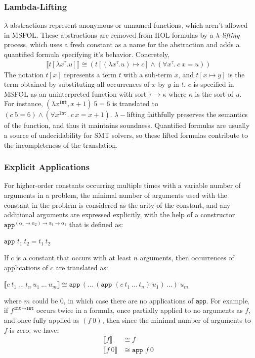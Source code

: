 \documentclass[11pt]{article}
\begin{document}
	\subsubsection{Lambda-Lifting}
	$\lambda$-abstractions represent 
	anonymous or unnamed functions, 
	which aren't allowed in MSFOL.
	These abstractions are removed
	from HOL formulas by a 
	\textit{$\lambda$-lifting} process,
	which uses a fresh constant as a
	name for the abstraction and adds 
	a quantified formula specifying 
	it's behavior. Concretely,
	\begin{align*}
	\llbracket t[\lambda x^{\tau}.u]
	\rrbracket \cong 
	(t[(\lambda x^{\tau}.u) \mapsto c]
	\land (\forall x^{\tau}.\ c\ x = u))
	\end{align*}
	The notation $t[x]$ represents a 
	term $t$ with a sub-term $x$, 
	and $t[x \mapsto y]$ is the 
	term obtained by substituting all 
	occurrences of $x$ by $y$ in $t$.
	$c$ is specified in MSFOL as an 
	uninterpreted function with sort 
	$\tau \to \kappa$ where $\kappa$ 
	is the sort of $u$. For instance, 
	$(\lambda x^{\texttt{Int}}, x + 1)\ 
	5 = 6$
	is translated to $(c\ 5 = 6) \land
	(\forall x^{\texttt{Int}}.\ 
	c\ x = x + 1)$. $\lambda-$lifting
	faithfully preserves the 
	semantics of the function, and 
	thus it maintains soundness. 
	Quantified formulas are usually a 
	source of undecidability for SMT 
	solvers, so these lifted formulas 
	contribute to the incompleteness
	of the translation.
	
	\subsubsection{Explicit Applications}
	For higher-order constants 
	occurring multiple times with 
	a variable number 
	of arguments in a problem, 
	the minimal number of arguments 
	used with the constant in the 
	problem is considered as the arity 
	of the constant, and any additional 
	arguments are expressed 
	explicitly, with the help of a 
	constructor 
	$\texttt{app}^{(\alpha_1 \to 
		\alpha_2) \to \alpha_1 \to 
		\alpha_2}$ that is defined as:
	\begin{center}
		$\texttt{app }t_1\ t_2 = 
		t_1\ t_2$
	\end{center}
	If $c$ is a constant that 
	occurs with at least $n$
	arguments, then 
	occurrences of applications 
	of $c$ are translated as:
	\begin{center}
		$\llbracket c\ t_1\ ...\ t_n
		\ u_1\ ...\ u_m \rrbracket
		\cong \texttt{app}\ (...\ 
		(\texttt{app }(c\ t_1\ 
		...\ t_n)\ u_1)	\ ...)\ u_m$
	\end{center}
	where $m$ could be $0$, in which 
	case there are no applications 
	of \texttt{app}. For example, if 
	$f^{\texttt{Int} \to \texttt{Int}}$ 
	occurs twice in a formula, once 
	partially applied to no arguments 
	as $f$, and once fully applied as 
	$(f\ 0)$, then since the minimal 
	number of arguments to $f$ is 
	zero, we have:
	\begin{align*}
	\llbracket f \rrbracket &\cong
	f\\
	\llbracket f\ 0 \rrbracket &\cong
	\texttt{app } f\ 0
	\end{align*}
	
\end{document}
